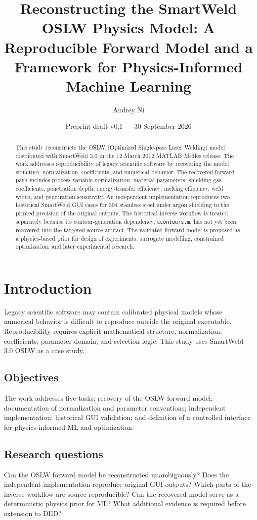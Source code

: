 \documentclass[11pt,a4paper]{article}
\title{Reconstructing the SmartWeld OSLW Physics Model: A Reproducible Forward Model and a Framework for Physics-Informed Machine Learning}
\author{Andrey Ni}
\date{Preprint draft v0.1 --- 30 September 2026}
\begin{document}
\maketitle
\begin{abstract}
This study reconstructs the OSLW (Optimized Single-pass Laser Welding) model
distributed with SmartWeld 3.0 in the 12 March 2012 MATLAB M-files release.
The work addresses reproducibility of legacy scientific software by recovering
the model structure, normalization, coefficients, and numerical behavior. The
recovered forward path includes process-variable normalization, material
parameters, shielding-gas coefficients, penetration depth, energy-transfer
efficiency, melting efficiency, weld width, and penetration sensitivity. An
independent implementation reproduces two historical SmartWeld GUI cases for
304 stainless steel under argon shielding to the printed precision of the
original outputs. The historical inverse workflow is treated separately because
its contour-generation dependency, \texttt{ccontours.m}, has not yet been
recovered into the targeted source artifact. The validated forward model is
proposed as a physics-based prior for design of experiments, surrogate modelling,
constrained optimization, and later experimental research.
\end{abstract}
\section{Introduction}
Legacy scientific software may contain calibrated physical models whose numerical
behavior is difficult to reproduce outside the original executable. Reproducibility
requires explicit mathematical structure, normalization, coefficients, parameter
domain, and selection logic. This study uses SmartWeld 3.0 OSLW as a case study.
\subsection{Objectives}
The work addresses five tasks: recovery of the OSLW forward model; documentation
of normalization and parameter conventions; independent implementation; historical
GUI validation; and definition of a controlled interface for physics-informed ML
and optimization.
\subsection{Research questions}
Can the OSLW forward model be reconstructed unambiguously? Does the independent
implementation reproduce original GUI outputs? Which parts of the inverse workflow
are source-reproducible? Can the recovered model serve as a deterministic physics
prior for ML? What additional evidence is required before extension to DED?
\end{document}
